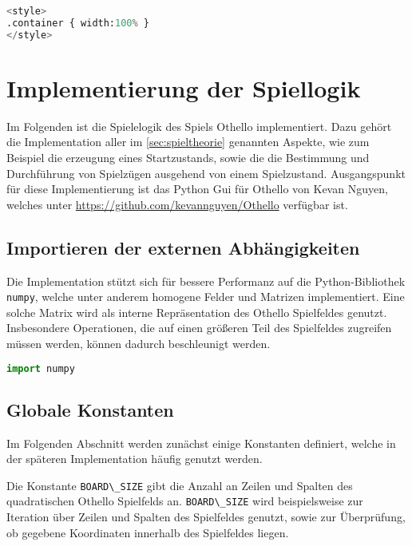 \begin{lstlisting}[language=Python]
%%HTML
<style>
.container { width:100% }
</style>
\end{lstlisting}

\hypertarget{implementierung-der-spiellogik}{%
\section{Implementierung der
Spiellogik}\label{implementierung-der-spiellogik}}

Im Folgenden ist die Spielelogik des Spiels Othello implementiert. Dazu
gehört die Implementation aller im \autoref{sec:spieltheorie} genannten
Aspekte, wie zum Beispiel die erzeugung eines Startzustands, sowie die
die Bestimmung und Durchführung von Spielzügen ausgehend von einem
Spielzustand. Ausgangspunkt für diese Implementierung ist das Python Gui
für Othello von Kevan Nguyen, welches unter
\url{https://github.com/kevannguyen/Othello} verfügbar ist.

\hypertarget{importieren-der-externen-abhuxe4ngigkeiten}{%
\subsection{Importieren der externen
Abhängigkeiten}\label{importieren-der-externen-abhuxe4ngigkeiten}}

Die Implementation stützt sich für bessere Performanz auf die
Python-Bibliothek \passthrough{\lstinline!numpy!}, welche unter anderem
homogene Felder und Matrizen implementiert. Eine solche Matrix wird als
interne Repräsentation des Othello Spielfeldes genutzt. Insbesondere
Operationen, die auf einen größeren Teil des Spielfeldes zugreifen
müssen werden, können dadurch beschleunigt werden.

\begin{lstlisting}[language=Python]
import numpy
\end{lstlisting}

\hypertarget{globale-konstanten}{%
\subsection{Globale Konstanten}\label{globale-konstanten}}

Im Folgenden Abschnitt werden zunächst einige Konstanten definiert,
welche in der späteren Implementation häufig genutzt werden.

Die Konstante \passthrough{\lstinline!BOARD\_SIZE!} gibt die Anzahl an
Zeilen und Spalten des quadratischen Othello Spielfelds an.
\passthrough{\lstinline!BOARD\_SIZE!} wird beispielsweise zur Iteration
über Zeilen und Spalten des Spielfeldes genutzt, sowie zur Überprüfung,
ob gegebene Koordinaten innerhalb des Spielfeldes liegen.

